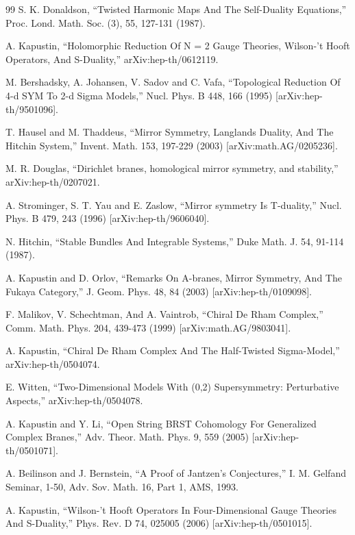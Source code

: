 \documentclass[11pt,a4paper,UTF8]{ctexart}
\begin{document}
\begin{thebibliography}{99}
S. K. Donaldson, ``Twisted Harmonic Maps And The Self-Duality Equations,'' Proc. Lond. Math. Soc. (3), 55, 127-131 (1987).

A. Kapustin, ``Holomorphic Reduction Of N = 2 Gauge Theories, Wilson-'t Hooft Operators, And S-Duality,'' arXiv:hep-th/0612119.

M. Bershadsky, A. Johansen, V. Sadov and C. Vafa, ``Topological Reduction Of 4-d SYM To 2-d Sigma Models,'' Nucl. Phys. B 448, 166 (1995) [arXiv:hep-th/9501096].

T. Hausel and M. Thaddeus, ``Mirror Symmetry, Langlands Duality, And The Hitchin System,'' Invent. Math. 153, 197-229 (2003) [arXiv:math.AG/0205236].

M. R. Douglas, ``Dirichlet branes, homological mirror symmetry, and stability,'' arXiv:hep-th/0207021.

A. Strominger, S. T. Yau and E. Zaslow, ``Mirror symmetry Is T-duality,'' Nucl. Phys. B 479, 243 (1996) [arXiv:hep-th/9606040].

N. Hitchin, ``Stable Bundles And Integrable Systems,'' Duke Math. J. 54, 91-114 (1987).

A. Kapustin and D. Orlov, ``Remarks On A-branes, Mirror Symmetry, And The Fukaya Category,'' J. Geom. Phys. 48, 84 (2003) [arXiv:hep-th/0109098].

F. Malikov, V. Schechtman, And A. Vaintrob, ``Chiral De Rham Complex,'' Comm. Math. Phys. 204, 439-473 (1999) [arXiv:math.AG/9803041].


A. Kapustin, ``Chiral De Rham Complex And The Half-Twisted Sigma-Model,'' arXiv:hep-th/0504074.

E. Witten, ``Two-Dimensional Models With (0,2) Supersymmetry: Perturbative Aspects,'' arXiv:hep-th/0504078.

A. Kapustin and Y. Li, ``Open String BRST Cohomology For Generalized Complex Branes,'' Adv. Theor. Math. Phys. 9, 559 (2005) [arXiv:hep-th/0501071].

A. Beilinson and J. Bernstein, ``A Proof of Jantzen's Conjectures,'' I. M. Gelfand Seminar, 1-50, Adv. Sov. Math. 16, Part 1, AMS, 1993.

A. Kapustin, ``Wilson-'t Hooft Operators In Four-Dimensional Gauge Theories And S-Duality,'' Phys. Rev. D 74, 025005 (2006) [arXiv:hep-th/0501015].


\end{thebibliography}
\end{document}
